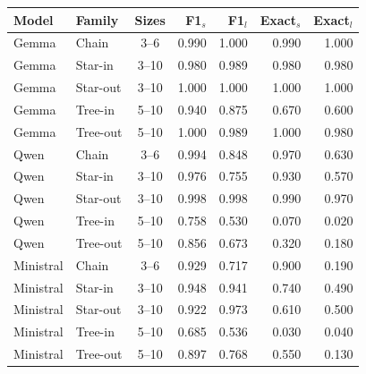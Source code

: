 \begin{tabular}{llcrrrr}
\toprule
Model & Family & Sizes & F1$_{s}$ & F1$_{l}$ & Exact$_s$ & Exact$_l$ \\
\midrule
Gemma & Chain & 3--6 & 0.990 & 1.000 & 0.990 & 1.000 \\
Gemma & Star-in & 3--10 & 0.980 & 0.989 & 0.980 & 0.980 \\
Gemma & Star-out & 3--10 & 1.000 & 1.000 & 1.000 & 1.000 \\
Gemma & Tree-in & 5--10 & 0.940 & 0.875 & 0.670 & 0.600 \\
Gemma & Tree-out & 5--10 & 1.000 & 0.989 & 1.000 & 0.980 \\
Qwen & Chain & 3--6 & 0.994 & 0.848 & 0.970 & 0.630 \\
Qwen & Star-in & 3--10 & 0.976 & 0.755 & 0.930 & 0.570 \\
Qwen & Star-out & 3--10 & 0.998 & 0.998 & 0.990 & 0.970 \\
Qwen & Tree-in & 5--10 & 0.758 & 0.530 & 0.070 & 0.020 \\
Qwen & Tree-out & 5--10 & 0.856 & 0.673 & 0.320 & 0.180 \\
Ministral & Chain & 3--6 & 0.929 & 0.717 & 0.900 & 0.190 \\
Ministral & Star-in & 3--10 & 0.948 & 0.941 & 0.740 & 0.490 \\
Ministral & Star-out & 3--10 & 0.922 & 0.973 & 0.610 & 0.500 \\
Ministral & Tree-in & 5--10 & 0.685 & 0.536 & 0.030 & 0.040 \\
Ministral & Tree-out & 5--10 & 0.897 & 0.768 & 0.550 & 0.130 \\
\bottomrule
\end{tabular}
